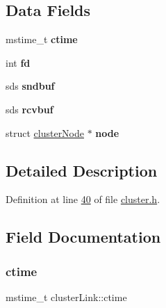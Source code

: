 \subsection*{Data Fields}
\begin{DoxyCompactItemize}
\item 
\mbox{\label{structclusterLink_a69eb3bcdbd3b4f2d7b0e732c83644c17}} 
mstime\+\_\+t {\bfseries ctime}
\item 
\mbox{\label{structclusterLink_a97768f8f216e1325b79f89d32f385976}} 
int {\bfseries fd}
\item 
\mbox{\label{structclusterLink_a18b2dfe01bf0cfb814944020ca6cef64}} 
sds {\bfseries sndbuf}
\item 
\mbox{\label{structclusterLink_aa464832be4f8c9941ad3344918f25929}} 
sds {\bfseries rcvbuf}
\item 
\mbox{\label{structclusterLink_af1afe49ebbbd6508d59bb4e56bbde563}} 
struct \hyperlink{structclusterNode}{cluster\+Node} $\ast$ {\bfseries node}
\end{DoxyCompactItemize}


\subsection{Detailed Description}


Definition at line \hyperlink{cluster_8h_source_l00040}{40} of file \hyperlink{cluster_8h_source}{cluster.\+h}.



\subsection{Field Documentation}
\mbox{\label{structclusterLink_a69eb3bcdbd3b4f2d7b0e732c83644c17}} 
\subsubsection{\texorpdfstring{ctime}{ctime}}
{\footnotesize\ttfamily mstime\+\_\+t cluster\+Link\+::ctime}



